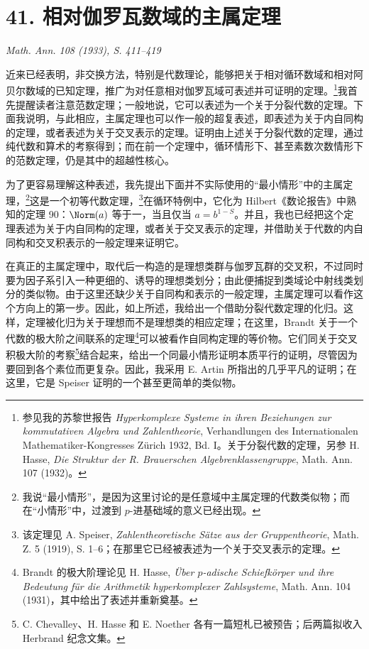 \section*{41. 相对伽罗瓦数域的主属定理}

\begin{center}
\emph{Math. Ann. 108 (1933), S. 411--419}
\end{center}

近来已经表明，非交换方法，特别是代数理论，能够把关于相对循环数域和相对阿贝尔数域的已知定理，推广为对任意相对伽罗瓦域可表述并可证明的定理。\footnote{参见我的苏黎世报告 \emph{Hyperkomplexe Systeme in ihren Beziehungen zur kommutativen Algebra und Zahlentheorie}, Verhandlungen des Internationalen Mathematiker-Kongresses Zürich 1932, Bd. I。关于分裂代数的定理，另参 H. Hasse, \emph{Die Struktur der R. Brauerschen Algebrenklassengruppe}, Math. Ann. 107 (1932)。}我首先提醒读者注意范数定理；一般地说，它可以表述为一个关于分裂代数的定理。下面我说明，与此相应，主属定理也可以作一般的超复表述，即表述为关于内自同构的定理，或者表述为关于交叉表示的定理。证明由上述关于分裂代数的定理，通过纯代数和算术的考察得到；而在前一个定理中，循环情形下、甚至素数次数情形下的范数定理，仍是其中的超越性核心。

为了更容易理解这种表述，我先提出下面并不实际使用的“最小情形”中的主属定理，\footnote{我说“最小情形”，是因为这里讨论的是任意域中主属定理的代数类似物；而在“小情形”中，过渡到 \(p\)-进基础域的意义已经出现。}这是一个初等代数定理，\footnote{该定理见 A. Speiser, \emph{Zahlentheoretische Sätze aus der Gruppentheorie}, Math. Z. 5 (1919), S. 1--6；在那里它已经被表述为一个关于交叉表示的定理。}在循环特例中，它化为 Hilbert《数论报告》中熟知的定理 90：\(\Norm(a)\) 等于一，当且仅当 \(a=b^{1-S}\)。并且，我也已经把这个定理表述为关于内自同构的定理，或者关于交叉表示的定理，并借助关于代数的内自同构和交叉积表示的一般定理来证明它。

在真正的主属定理中，取代后一构造的是理想类群与伽罗瓦群的交叉积，不过同时要为因子系引入一种更细的、诱导的理想类划分；由此便捕捉到类域论中射线类划分的类似物。由于这里还缺少关于自同构和表示的一般定理，主属定理可以看作这个方向上的第一步。因此，如上所述，我给出一个借助分裂代数定理的化归。这样，定理被化归为关于理想而不是理想类的相应定理；在这里，Brandt 关于一个代数的极大阶之间联系的定理\footnote{Brandt 的极大阶理论见 H. Hasse, \emph{Über \(p\)-adische Schiefkörper und ihre Bedeutung für die Arithmetik hyperkomplexer Zahlsysteme}, Math. Ann. 104 (1931)，其中给出了表述并重新奠基。}可以被看作自同构定理的等价物。它们同关于交叉积极大阶的考察\footnote{C. Chevalley、H. Hasse 和 E. Noether 各有一篇短札已被预告；后两篇拟收入 Herbrand 纪念文集。}结合起来，给出一个同最小情形证明本质平行的证明，尽管因为要回到各个素位而更复杂。因此，我采用 E. Artin 所指出的几乎平凡的证明；在这里，它是 Speiser 证明的一个甚至更简单的类似物。

